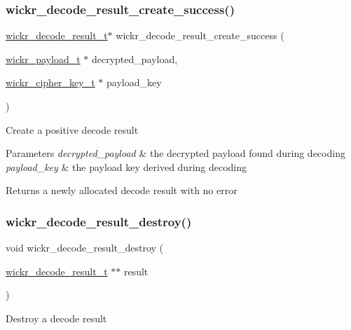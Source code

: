 \subsubsection{\texorpdfstring{wickr\+\_\+decode\+\_\+result\+\_\+create\+\_\+success()}{wickr\_decode\_result\_create\_success()}}
{\footnotesize\ttfamily \hyperlink{structwickr__decode__result}{wickr\+\_\+decode\+\_\+result\+\_\+t}$\ast$ wickr\+\_\+decode\+\_\+result\+\_\+create\+\_\+success (\begin{DoxyParamCaption}\item[{\hyperlink{structwickr__payload}{wickr\+\_\+payload\+\_\+t} $\ast$}]{decrypted\+\_\+payload,  }\item[{\hyperlink{structwickr__cipher__key}{wickr\+\_\+cipher\+\_\+key\+\_\+t} $\ast$}]{payload\+\_\+key }\end{DoxyParamCaption})}

Create a positive decode result


\begin{DoxyParams}{Parameters}
{\em decrypted\+\_\+payload} & the decrypted payload found during decoding \\
\hline
{\em payload\+\_\+key} & the payload key derived during decoding \\
\hline
\end{DoxyParams}
\begin{DoxyReturn}{Returns}
a newly allocated decode result with no error 
\end{DoxyReturn}
\mbox{\label{group__wickr__protocol_ga94154ab44a6c2e9b97a115e37416efe1}} 
\subsubsection{\texorpdfstring{wickr\+\_\+decode\+\_\+result\+\_\+destroy()}{wickr\_decode\_result\_destroy()}}
{\footnotesize\ttfamily void wickr\+\_\+decode\+\_\+result\+\_\+destroy (\begin{DoxyParamCaption}\item[{\hyperlink{structwickr__decode__result}{wickr\+\_\+decode\+\_\+result\+\_\+t} $\ast$$\ast$}]{result }\end{DoxyParamCaption})}

Destroy a decode result


